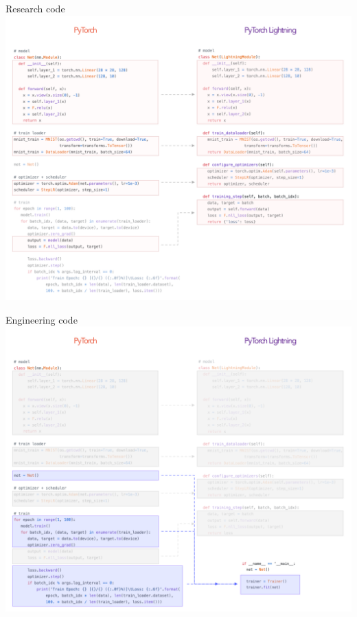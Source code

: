 \documentclass[aspectratio=169]{beamer}
\begin{document}
	\begin{frame}{Research code}
		\centering
		\includegraphics[height=0.9\textheight]{pt_to_pl.png}
	\end{frame}

	\begin{frame}{Engineering code}
		\centering
		\includegraphics[height=0.9\textheight]{pt_trainer.png}
	\end{frame}
\end{document}

